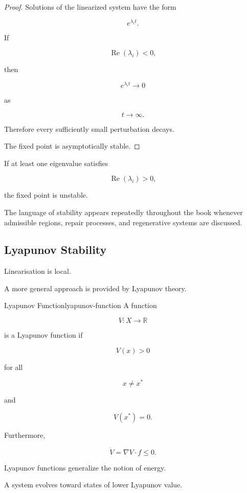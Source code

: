 \documentclass[12pt,twoside,openright]{book}
\begin{document}
\begin{proof}
Solutions of the linearized system have the form

\[
e^{\lambda_i t}.
\]

If

\[
\operatorname{Re}(\lambda_i)<0,
\]

then

\[
e^{\lambda_i t}
\rightarrow0
\]

as

\[
t\rightarrow\infty.
\]

Therefore every sufficiently small perturbation decays.

The fixed point is asymptotically stable.
\end{proof}

\begin{corollary}
If at least one eigenvalue satisfies

\[
\operatorname{Re}(\lambda_i)>0,
\]

the fixed point is unstable.
\end{corollary}

The language of stability appears repeatedly throughout
the book whenever admissible regions, repair processes,
and regenerative systems are discussed.

\subsection{Lyapunov Stability}

Linearisation is local.

A more general approach is provided by Lyapunov theory.

\begin{definition}{Lyapunov Function}{lyapunov-function}
A function

\[
V:X\rightarrow\mathbb R
\]

is a Lyapunov function if

\[
V(x)>0
\]

for all

\[
x\neq x^*
\]

and

\[
V(x^*)=0.
\]

Furthermore,

\[
\dot V
=

\nabla V\cdot f
\le0.
\]
\end{definition}

Lyapunov functions generalize the notion of energy.

A system evolves toward states of lower Lyapunov value.
\end{document}
